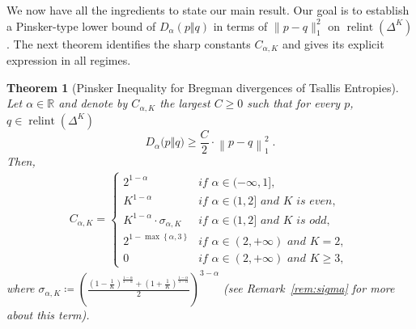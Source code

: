 \documentclass[11pt,oneside,a4paper]{article}
\newcommand{\R}{\mathbb{R}}
\newcommand{\lrb}[1]{\left(#1\right)}
\newcommand{\brb}[1]{\bigl(#1\bigr)}
\newcommand{\lcb}[1]{\left\{#1\right\}}
\newcommand{\lno}[1]{\left\lVert#1\right\rVert}
\theoremstyle{plain}
\newtheorem{theorem}{Theorem}
\theoremstyle{definition}
\theoremstyle{remark}
\newcommand{\simplex}[1]{\Delta^{#1}}
\DeclareMathOperator*{\relint}{relint}
\begin{document}
We now have all the ingredients to state our main result.
Our goal is to establish a Pinsker-type lower bound of $D_\alpha(p\Vert q)$ in terms of $\|p-q\|_1^2$ on $\relint\lrb{\simplex{K}}$.
The next theorem identifies the sharp constants \(C_{\alpha,K}\) and gives its explicit expression in all regimes.
\begin{theorem}[Pinsker Inequality for Bregman divergences of Tsallis Entropies]
\label{thm:pinsker}
Let $\alpha \in \R$ and denote by $C_{\alpha, K}$ the largest $C \geq 0$ such that for every $p$, $q \in  \relint\lrb{\simplex{K}}$
\begin{equation}    
    D_\alpha\brb{p\Vert q}
\ge
    \dfrac{C}{2} \cdot\lno{p - q}_1^2\;.
\end{equation}    
Then,
\begin{align}
    C_{\alpha,K} = 
    \begin{cases}
        2^{1-\alpha} \qquad &\textit{if $\alpha \in (-\infty,1]$,}
        \\
         K^{1-\alpha} \qquad &\textit{if $\alpha \in (1,2]$ and $K$ is even,}
        \\
        K^{1-\alpha} \cdot \sigma_{\alpha, K}  &\textit{if $\alpha \in (1,2]$ and $K$ is odd,}
        \\
         2^{1-\max\lcb{\alpha, 3}} &\textit{if $\alpha \in (2,+\infty)$ and $K = 2$, }
        \\
        0 &\textit{if $\alpha \in (2,+\infty)$ and $K \ge 3$,} 
    \end{cases}
\end{align}
where $\sigma_{\alpha, K} \coloneq \lrb{  \frac{ (1-\frac{1}{K})^{\frac{1 - \alpha}{3- \alpha}} + (1+\frac{1}{K})^{\frac{1 - \alpha}{3- \alpha}} }{2} }^{3 - \alpha}$ (see Remark~\ref{rem:sigma} for more about this term).
\end{theorem}
\end{document}
